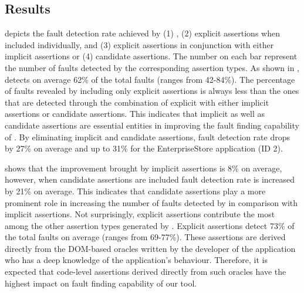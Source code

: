 \subsection{Results} \label{Sec:results}
  depicts the fault detection rate achieved by (1) \tool, (2) explicit assertions when included individually, and (3) explicit assertions in conjunction with either implicit assertions or (4) candidate assertions. The number on each bar represent the number of faults detected by the corresponding assertion types. As shown in , \tool detects on average 62\% of the total faults (ranges from 42-84\%).
The percentage of faults revealed by including only explicit assertions is always less than the ones that are detected through the combination of explicit with either implicit assertions or candidate assertions. This indicates that implicit as well as candidate assertions are essential entities in improving the fault finding capability of \tool. By eliminating implicit and candidate assertions, fault detection rate drops by 27\% on average and up to 31\% for the EnterpriseStore application (ID 2).

 shows that the improvement brought by implicit assertions is 8\% on average, however, when candidate assertions are included fault detection rate is increased by 21\% on average. This indicates that candidate assertions play a more prominent role in increasing the number of faults detected by \tool in comparison with implicit assertions. Not surprisingly, explicit assertions contribute the most among the other assertion types generated by \tool. Explicit assertions detect 73\% of the total faults on average (ranges from 69-77\%). These assertions are derived directly from the DOM-based oracles written by the developer of the application who has a deep knowledge of the application's behaviour. Therefore, it is expected that code-level assertions derived directly from such oracles have the highest impact on fault finding capability of our tool.        


